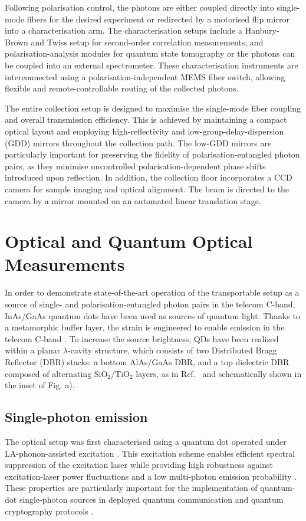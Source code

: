 \documentclass[aps,pra,twocolumn,superscriptaddress]{revtex4-1}
\begin{document}
Following polarisation control, the photons are either coupled directly into single-mode fibers for the desired experiment or redirected by a motorised flip mirror into a characterisation arm. The characterisation setups include a Hanbury-Brown and Twiss setup for second-order correlation measurements, and polarisation-analysis modules for quantum state tomography or the photons can be coupled into an external spectrometer. These characterisation instruments are interconnected using a polarisation-independent MEMS fiber switch, allowing flexible and remote-controllable routing of the collected photons.

The entire collection setup is designed to maximise the single-mode fiber coupling and overall transmission efficiency. This is achieved by maintaining a compact optical layout and employing high-reflectivity and low-group-delay-dispersion (GDD) mirrors throughout the collection path. The low-GDD mirrors are particularly important for preserving the fidelity of polarisation-entangled photon pairs, as they minimise uncontrolled polarisation-dependent phase shifts introduced upon reflection. In addition, the collection floor incorporates a CCD camera for sample imaging and optical alignment. The beam is directed to the camera by a mirror mounted on an automated linear translation stage.

\section{Optical and Quantum Optical Measurements}

In order to demonstrate state-of-the-art operation of the transportable setup as a source of single- and polarisation-entangled photon pairs in the telecom C-band, InAs/GaAs quantum dots have been used as sources of quantum light. Thanks to a metamorphic buffer layer, the strain is engineered to enable emission in the telecom C-band . To increase the source brightness, QDs have been realized within a planar $\lambda$-cavity structure, which consists of two Distributed Bragg Reflector (DBR) stacks: a bottom AlAs/GaAs DBR, and a top dielectric DBR composed of alternating SiO$_2$/TiO$_2$ layers, as in Ref.~ and schematically shown in the inset of Fig. a).

\subsection{Single-photon emission}

The optical setup was first characterised using a quantum dot operated under LA-phonon-assisted excitation . This excitation scheme enables efficient spectral suppression of the excitation laser while providing high robustness against excitation-laser power fluctuations and a low multi-photon emission probability . These properties are particularly important for the implementation of quantum-dot single-photon sources in deployed quantum communication and quantum cryptography protocols .
\end{document}
